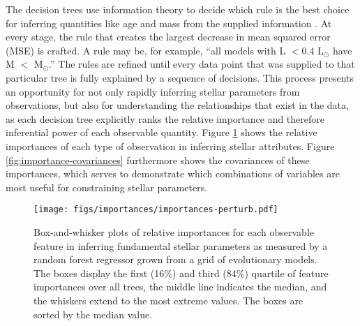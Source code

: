 \documentclass[manuscript]{aastex}
\begin{document}
The decision trees use information theory to decide which rule is the best choice for inferring quantities like age and mass from the supplied information \citep[see chapter 9 of][]{hastie2005elements}. At every stage, the rule that creates the largest decrease in mean squared error (MSE) is crafted. A rule may be, for example, ``all models with L $<0.4$ L$_\odot$ have M $<$ M$_\odot$.'' The rules are refined until every data point that was supplied to that particular tree is fully explained by a sequence of decisions. This process presents an opportunity for not only rapidly inferring stellar parameters from observations, but also for understanding the relationships that exist in the data, as each decision tree explicitly ranks the relative importance and therefore inferential power of each observable quantity. Figure \ref{fig:importances} shows the relative importances of each type of observation in inferring stellar attributes. Figure \ref{fig:importance-covariances} furthermore shows the covariances of these importances, which serves to demonstrate which combinations of variables are most useful for constraining stellar parameters. 

\begin{figure}
    \centering
    \texttt{[image: figs/importances/importances-perturb.pdf]}
    \caption{Box-and-whisker plots of relative importances for each observable feature in inferring fundamental stellar parameters as measured by a random forest regressor grown from a grid of evolutionary models. The boxes display the first (16\%) and third (84\%) quartile of feature importances over all trees, the middle line indicates the median, and the whiskers extend to the most extreme values. The boxes are sorted by the median value.}
    \label{fig:importances}
\end{figure}
\end{document}
